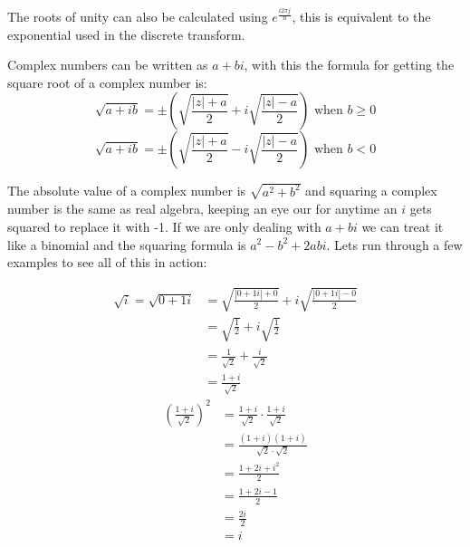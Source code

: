 \documentclass[12pt]{article}
\begin{document}
The roots of unity can also be calculated using $e^\frac{i2\pi j}{n}$, this is equivalent to the exponential used in the discrete transform.

\pagebreak

Complex numbers can be written as $a + bi$, with this the formula for getting the square root of a complex number is:
\begin{displaymath}
  \sqrt{a+ib} = \pm\left(\sqrt{\frac{|z| + a}{2}} + i\sqrt{\frac{|z| - a}{2}}\right) \text{ when } b \ge 0
\end{displaymath}
\begin{displaymath}
  \sqrt{a+ib} = \pm\left(\sqrt{\frac{|z| + a}{2}} - i\sqrt{\frac{|z| - a}{2}}\right) \text{ when } b < 0
\end{displaymath}

The absolute value of a complex number is $\sqrt{a^2+b^2}$ and squaring a complex number is the same as real algebra, keeping an eye our for anytime an $i$ gets squared to replace it with -1. If we are only dealing with $a + bi$ we can treat it like a binomial and the squaring formula is $a^2 - b^2 + 2abi$. Lets run through a few examples to see all of this in action:
\begin{multicols}{2}
  \null \vfill
  \begin{align*}
    \sqrt{i} = \sqrt{0+1i} & = \sqrt{\frac{|0+1i| + 0}{2}} + i\sqrt{\frac{|0+1i| - 0}{2}} \\
                           & = \sqrt{\frac{1}{2}} + i\sqrt{\frac{1}{2}}                   \\
                           & = \frac{1}{\sqrt{2}} + \frac{i}{\sqrt{2}}                    \\
                           & = \frac{1+i}{\sqrt{2}}
  \end{align*}
  \vfill \null
  \columnbreak
  \null \vfill
  \begin{align*}
    \left(\frac{1+i}{\sqrt{2}}\right)^2 & = \frac{1+i}{\sqrt{2}} \cdot \frac{1+i}{\sqrt{2}} \\
                                        & = \frac{(1+i)(1+i)}{\sqrt{2}\cdot\sqrt{2}}        \\
                                        & = \frac{1+2i+i^2}{2}                              \\
                                        & = \frac{1+2i-1}{2}                                \\
                                        & = \frac{2i}{2}                                    \\
                                        & = i
  \end{align*}
  \vfill \null
\end{multicols}
\end{document}
